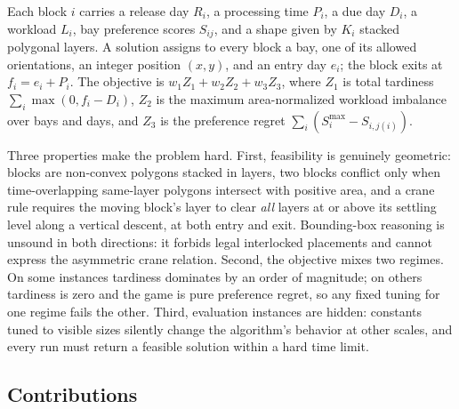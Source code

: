 \documentclass[runningheads]{llncs}
\begin{document}
Each block $i$ carries a release day $R_i$, a processing time $P_i$, a due day
$D_i$, a workload $L_i$, bay preference scores $S_{ij}$, and a shape given by
$K_i$ stacked polygonal layers. A solution assigns to every block a bay, one
of its allowed orientations, an integer position $(x,y)$, and an entry day
$e_i$; the block exits at $f_i = e_i + P_i$. The objective is
$w_1 Z_1 + w_2 Z_2 + w_3 Z_3$, where $Z_1$ is total tardiness
$\sum_i \max(0, f_i - D_i)$, $Z_2$ is the maximum area-normalized workload
imbalance over bays and days, and $Z_3$ is the preference regret
$\sum_i (S_i^{\max} - S_{i,j(i)})$.

Three properties make the problem hard. First, feasibility is genuinely
geometric: blocks are non-convex polygons stacked in layers, two blocks
conflict only when time-overlapping same-layer polygons intersect with
positive area, and a crane rule requires the moving block's layer to clear
\emph{all} layers at or above its settling level along a vertical descent, at
both entry and exit. Bounding-box reasoning is unsound in both directions: it
forbids legal interlocked placements and cannot express the asymmetric crane
relation. Second, the objective mixes two regimes. On some instances tardiness
dominates by an order of magnitude; on others tardiness is zero and the game
is pure preference regret, so any fixed tuning for one regime fails the other.
Third, evaluation instances are hidden: constants tuned to visible sizes
silently change the algorithm's behavior at other scales, and every run must
return a feasible solution within a hard time limit.

\subsection{Contributions}
\end{document}
